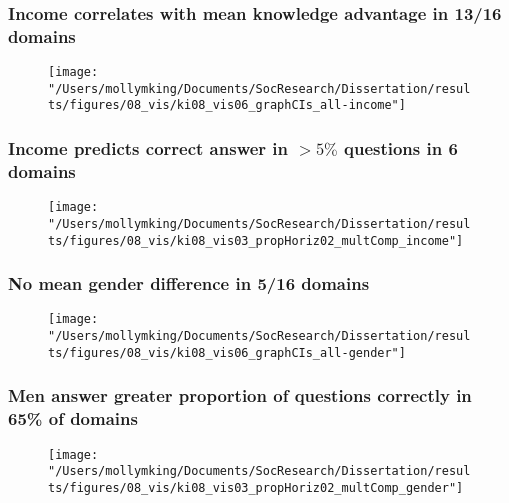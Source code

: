 \documentclass[pdf]{beamer}
\begin{document}
\begin{frame}
\frametitle{Income correlates with mean knowledge advantage in 13/16 domains}
  \begin{figure}[ht]
    \begin{center}
    \texttt{[image: "/Users/mollymking/Documents/SocResearch/Dissertation/results/figures/08\_vis/ki08\_vis06\_graphCIs\_all-income"]}
    \end{center}
  \end{figure}

\end{frame}


\begin{frame}
\frametitle{Income predicts correct answer in $> 5\%$ questions in 6 domains}
  \begin{figure}[ht]
    \begin{center}
    \texttt{[image: "/Users/mollymking/Documents/SocResearch/Dissertation/results/figures/08\_vis/ki08\_vis03\_propHoriz02\_multComp\_income"]}
    \end{center}
  \end{figure}

\end{frame}


\begin{frame}
\frametitle{No mean gender difference in 5/16 domains}
  \begin{figure}[ht]
    \begin{center}
      \texttt{[image: "/Users/mollymking/Documents/SocResearch/Dissertation/results/figures/08\_vis/ki08\_vis06\_graphCIs\_all-gender"]}
    \end{center}
  \end{figure}

\end{frame}


\begin{frame}
\frametitle{Men answer greater proportion of questions correctly in 65\% of domains}
  \begin{figure}[ht]
    \begin{center}
      \texttt{[image: "/Users/mollymking/Documents/SocResearch/Dissertation/results/figures/08\_vis/ki08\_vis03\_propHoriz02\_multComp\_gender"]}
    \end{center}
  \end{figure}

\end{frame}
\end{document}
